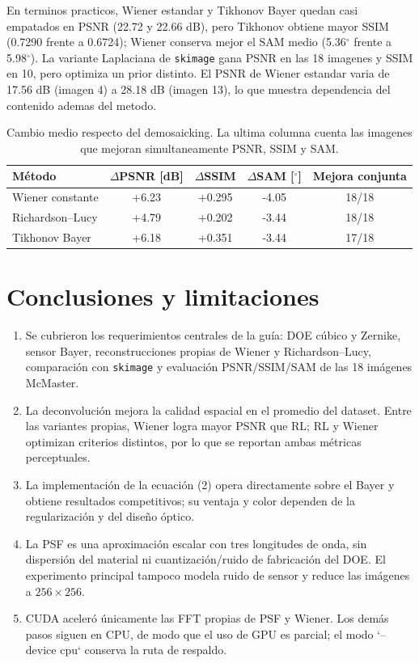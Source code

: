 \documentclass[11pt,a4paper]{article}
\begin{document}
En terminos practicos, Wiener estandar y Tikhonov Bayer quedan casi empatados en PSNR (22.72 y 22.66 dB), pero Tikhonov obtiene mayor SSIM (0.7290 frente a 0.6724); Wiener conserva mejor el SAM medio (5.36$^\circ$ frente a 5.98$^\circ$). La variante Laplaciana de \texttt{skimage} gana PSNR en las 18 imagenes y SSIM en 10, pero optimiza un prior distinto. El PSNR de Wiener estandar varia de 17.56 dB (imagen 4) a 28.18 dB (imagen 13), lo que muestra dependencia del contenido ademas del metodo.
\begin{table}[H]\centering\small
\caption{Cambio medio respecto del demosaicking. La ultima columna cuenta las imagenes que mejoran simultaneamente PSNR, SSIM y SAM.}
\label{tab:ganancias}\begin{tabular}{lcccc}\toprule
M\'etodo & $\Delta$PSNR [dB] & $\Delta$SSIM & $\Delta$SAM [$^\circ$] & Mejora conjunta \tabularnewline\midrule
Wiener constante & +6.23 & +0.295 & -4.05 & 18/18 \tabularnewline
Richardson--Lucy & +4.79 & +0.202 & -3.44 & 18/18 \tabularnewline
Tikhonov Bayer & +6.18 & +0.351 & -3.44 & 17/18 \tabularnewline\bottomrule\end{tabular}\end{table}


\section{Conclusiones y limitaciones}
\begin{enumerate}[leftmargin=*]
\item Se cubrieron los requerimientos centrales de la gu\'ia: DOE c\'ubico y Zernike, sensor Bayer, reconstrucciones propias de Wiener y Richardson--Lucy, comparaci\'on con \texttt{skimage} y evaluaci\'on PSNR/SSIM/SAM de las 18 im\'agenes McMaster.
\item La deconvoluci\'on mejora la calidad espacial en el promedio del dataset. Entre las variantes propias, Wiener logra mayor PSNR que RL; RL y Wiener optimizan criterios distintos, por lo que se reportan ambas m\'etricas perceptuales.
\item La implementaci\'on de la ecuaci\'on (2) opera directamente sobre el Bayer y obtiene resultados competitivos; su ventaja y color dependen de la regularizaci\'on y del dise\~no \'optico.
\item La PSF es una aproximaci\'on escalar con tres longitudes de onda, sin dispersi\'on del material ni cuantizaci\'on/ruido de fabricaci\'on del DOE. El experimento principal tampoco modela ruido de sensor y reduce las im\'agenes a $256\times256$.
\item CUDA aceler\'o \'unicamente las FFT propias de PSF y Wiener. Los dem\'as pasos siguen en CPU, de modo que el uso de GPU es parcial; el modo `--device cpu` conserva la ruta de respaldo.
\end{enumerate}
\end{document}
